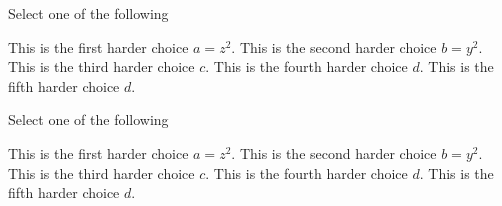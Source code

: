 \begin{problem}
Select one of the following
\begin{choices}
\choice This is the first harder choice $a = z^2$.
\choice This is the second harder choice $b = y^2$.
\correctchoice This is the third harder choice $c$.
\correctchoice This is the fourth harder choice $d$.
\choice This is the fifth harder choice $d$.
\end{choices}
\end{problem}

\begin{problem}
Select one of the following
\begin{choices}
\choice This is the first harder choice $a = z^2$.
\choice This is the second harder choice $b = y^2$.
\correctchoice This is the third harder choice $c$.
\correctchoice This is the fourth harder choice $d$.
\choice This is the fifth harder choice $d$.
\end{choices}
\end{problem}

